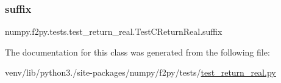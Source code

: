 \subsubsection{\texorpdfstring{suffix}{suffix}}
{\footnotesize\ttfamily numpy.\+f2py.\+tests.\+test\+\_\+return\+\_\+real.\+Test\+C\+Return\+Real.\+suffix\hspace{0.3cm}{\ttfamily [static]}}



The documentation for this class was generated from the following file\+:\begin{DoxyCompactItemize}
\item 
venv/lib/python3./site-\/packages/numpy/f2py/tests/\hyperlink{test__return__real_8py}{test\+\_\+return\+\_\+real.\+py}\end{DoxyCompactItemize}

